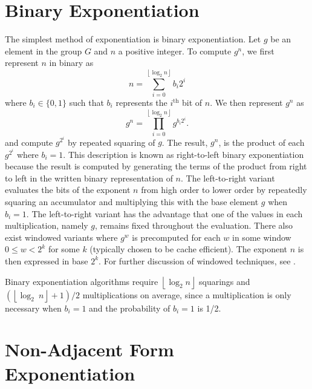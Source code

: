 \documentclass{ucalgthes1}
\theoremstyle{definition}
\newcommand{\floor}[1]{\left\lfloor #1 \right\rfloor}
\begin{document}
\section{Binary Exponentiation}
\label{sec:binaryExp}
The simplest method of exponentiation is binary exponentiation.  Let $g$ be an element in the group $G$ and $n$ a positive integer.  To compute $g^n$, we first represent $n$ in binary as
\[
	n = \sum_{i=0}^{\floor{\log_2 n}} b_i 2^i
\]
where $b_i \in \{0, 1\}$ such that $b_i$ represents the $i^{\textrm{th}}$ bit of $n$.  We then represent $g^n$ as
\[
	g^n = \prod_{i=0}^{\floor{\log_2 n}} g^{b_i 2^i}.
\]
and compute $g^{2^i}$ by repeated squaring of $g$.  The result, $g^n$, is the product of each $g^{2^i}$ where $b_i = 1$.  This description is known as right-to-left binary exponentiation because the result is computed by generating the terms of the product from right to left in the written binary representation of $n$.  The left-to-right variant evaluates the bits of the exponent $n$ from high order to lower order by repeatedly squaring an accumulator and multiplying this with the base element $g$ when $b_i = 1$.  The left-to-right variant has the advantage that one of the values in each multiplication, namely $g$, remains fixed throughout the evaluation.  There also exist windowed variants where $g^w$ is precomputed for each $w$ in some window $0 \le w < 2^k$ for some $k$ (typically chosen to be cache efficient). The exponent $n$ is then expressed in base $2^k$.  For further discussion of windowed techniques, see \cite{Cohen2006}.

Binary exponentiation algorithms require $\floor{\log_2 n}$ squarings and $\left(\floor{\log_2~n} + 1 \right)/2$ multiplications on average, since a multiplication is only necessary when $b_i = 1$ and the probability of $b_i = 1$ is 1/2.


\section{Non-Adjacent Form Exponentiation}
\label{sec:naf}
\end{document}
